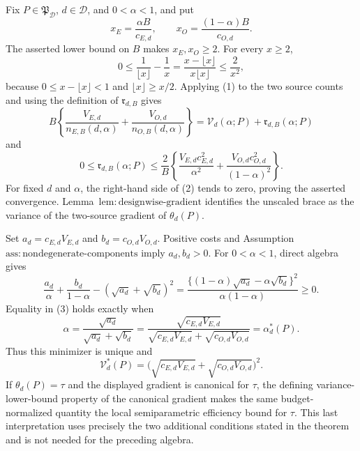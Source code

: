 Fix \(P\in\mathfrak P_{\mathcal D}\), \(d\in\mathcal D\), and \(0<\alpha<1\), and put
\[
x_E=\frac{\alpha B}{c_{E,d}},\qquad x_O=\frac{(1-\alpha)B}{c_{O,d}}.
\]
The asserted lower bound on \(B\) makes \(x_E,x_O\ge2\).  For every \(x\ge2\),
\[
0\le \frac1{\lfloor x\rfloor}-\frac1x
=\frac{x-\lfloor x\rfloor}{x\lfloor x\rfloor}
\le \frac2{x^2},                                                   \tag{1}
\]
because \(0\le x-\lfloor x\rfloor<1\) and \(\lfloor x\rfloor\ge x/2\).  Applying (1) to the two source counts and using the definition of \(\mathfrak r_{d,B}\) gives
\[
B\left\{\frac{V_{E,d}}{n_{E,B}(d,\alpha)}+
\frac{V_{O,d}}{n_{O,B}(d,\alpha)}\right\}
=\mathcal V_d(\alpha;P)+\mathfrak r_{d,B}(\alpha;P)
\]
and
\[
0\le\mathfrak r_{d,B}(\alpha;P)
\le \frac2B\left\{
\frac{V_{E,d}c_{E,d}^2}{\alpha^2}+
\frac{V_{O,d}c_{O,d}^2}{(1-\alpha)^2}\right\}.                    \tag{2}
\]
For fixed \(d\) and \(\alpha\), the right-hand side of (2) tends to zero, proving the asserted convergence.  Lemma~\(\mathrm{lem{:}designwise\text{-}gradient}\) identifies the unscaled brace as the variance of the two-source gradient of \(\theta_d(P)\).

Set \(a_d=c_{E,d}V_{E,d}\) and \(b_d=c_{O,d}V_{O,d}\).  Positive costs and Assumption~\(\mathrm{ass{:}nondegenerate\text{-}components}\) imply \(a_d,b_d>0\).  For \(0<\alpha<1\), direct algebra gives
\[
\frac{a_d}{\alpha}+\frac{b_d}{1-\alpha}
-(\sqrt{a_d}+\sqrt{b_d})^2
=\frac{\{(1-\alpha)\sqrt{a_d}-\alpha\sqrt{b_d}\}^2}
{\alpha(1-\alpha)}\ge0.                                           \tag{3}
\]
Equality in (3) holds exactly when
\[
\alpha=\frac{\sqrt{a_d}}{\sqrt{a_d}+\sqrt{b_d}}
=\frac{\sqrt{c_{E,d}V_{E,d}}}
{\sqrt{c_{E,d}V_{E,d}}+\sqrt{c_{O,d}V_{O,d}}}
=\alpha_d^*(P).
\]
Thus this minimizer is unique and
\[
\mathcal V_d^*(P)
=\bigl(\sqrt{c_{E,d}V_{E,d}}+\sqrt{c_{O,d}V_{O,d}}\bigr)^2.
\]
If \(\theta_d(P)=\tau\) and the displayed gradient is canonical for \(\tau\), the defining variance-lower-bound property of the canonical gradient makes the same budget-normalized quantity the local semiparametric efficiency bound for \(\tau\).  This last interpretation uses precisely the two additional conditions stated in the theorem and is not needed for the preceding algebra.
